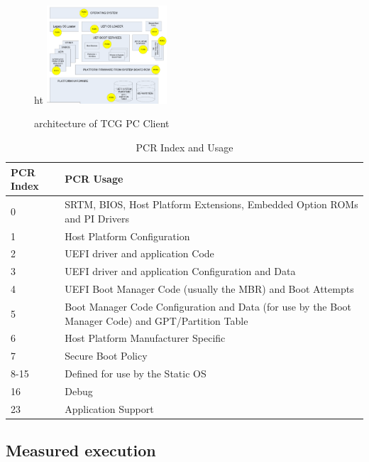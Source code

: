 \begin{figure}{ht}
    \centering
    \includegraphics[width=0.4\textwidth]{img/tcg-pcr-arch.png}
    \caption{architecture of TCG PC Client}
\end{figure}

\begin{table}[h]
    \centering
    \caption{PCR Index and Usage}
    \begin{tabular}{lp{}}
        \toprule
        \textbf{PCR Index} & \textbf{PCR Usage} \\ \midrule
        0  & SRTM, BIOS, Host Platform Extensions, \newline Embedded Option ROMs and PI Drivers \\ 
        1  & Host Platform Configuration \\ 
        2  & UEFI driver and application Code \\ 
        3  & UEFI driver and application Configuration and Data \\ 
        4  & UEFI Boot Manager Code (usually the MBR) and Boot Attempts \\ 
        5  & Boot Manager Code Configuration and Data \newline (for use by the Boot Manager Code) and GPT/Partition Table \\ 
        6  & Host Platform Manufacturer Specific \\ 
        7  & Secure Boot Policy \\ 
        8-15 & Defined for use by the Static OS \\ 
        16 & Debug \\ 
        23 & Application Support \\ 
        \bottomrule
    \end{tabular}
\end{table}

\subsection{Measured execution}

